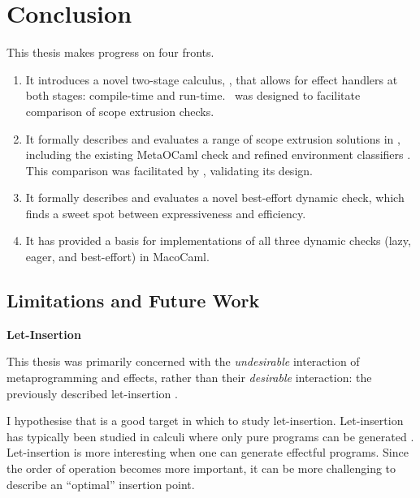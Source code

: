 \chapter{Conclusion}

This thesis makes progress on four fronts. 

\begin{enumerate}
\item It introduces a novel two-stage calculus, \calculusName{}, that allows for effect handlers at both stages: compile-time and run-time.\ \calculusName{} was designed to facilitate comparison of scope extrusion checks.

\item It formally describes and evaluates a range of scope extrusion solutions in \calculusName{}, including the existing MetaOCaml check \citep{kiselyov-14} and refined environment classifiers \citep{kiselyov-16}. This comparison was facilitated by \calculusName{}, validating its design.

\item It formally describes and evaluates a novel best-effort dynamic check, which finds a sweet spot between expressiveness and efficiency.

\item It has provided a basis for implementations of all three dynamic checks (lazy, eager, and best-effort) in MacoCaml. 
\end{enumerate}

\section{Limitations and Future Work}
\begin{minipage}[t]{0.25\textwidth}
  \textbf{\textsf{Let-Insertion}}
\end{minipage}%
\begin{minipage}[t]{0.75\textwidth}
  This thesis was primarily concerned with the \textit{undesirable} interaction of metaprogramming and effects, rather than their \textit{desirable} interaction: the previously described let-insertion \citep{yallop-2019}. 
  \vspace{2mm}

  I hypothesise that \calculusName{} is a good target in which to study let-insertion. Let-insertion has typically been studied in calculi where only pure programs can be generated \citep{isoda-24}. Let-insertion is more interesting when one can generate effectful programs. Since the order of operation becomes more important, it can be more challenging to describe an ``optimal'' insertion point.
  \vspace{4mm}
\end{minipage}\\


